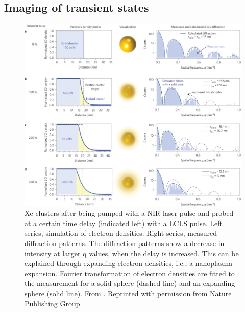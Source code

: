 \subsection{Imaging of transient states}
\begin{figure}
	\centering
		\includegraphics[width=1.00\textwidth]{images/tais-nat-photonics.jpg}
	\caption[Measurement and simulation of the nanoplasma expansion in Xe-clusters.]{Xe-clusters after being pumped with a NIR laser pulse and probed at a certain time delay (indicated left) with a LCLS pulse. Left series, simulation of electron densities. Right series, measured diffraction patterns. The diffraction patterns show a decrease in intensity at larger q values, when the delay is increased. This can be explained through expanding electron densities, i.e., a nanoplasma expansion. Fourier transformation of electron densities are fitted to the measurement for a solid sphere (dashed line) and an expanding sphere (solid line). From \citep{Gorkhover-2016-NatPho}. Reprinted with permission from Nature Publishing Group.}
	\label{fig:tais-nat-photonics}
\end{figure}
